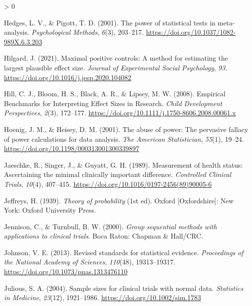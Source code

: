 \documentclass[
  english,
  ,jou,floatsintext]{apa6}
\newlength{\cslhangindent}
\newenvironment{CSLReferences}[2] %
 {%
  \setlength{\parindent}{0pt}
  \ifodd #1 \everypar{\setlength{\hangindent}{\cslhangindent}}\ignorespaces\fi
  \ifnum #2 > 0
  \setlength{\parskip}{#2\baselineskip}
  \fi
 }%
 {}
\begin{document}
\begin{CSLReferences}{1}{0}
\leavevmode\hypertarget{ref-hedges_power_2001}{}%
Hedges, L. V., \& Pigott, T. D. (2001). The power of statistical tests in meta-analysis. \emph{Psychological Methods}, \emph{6}(3), 203--217. \url{https://doi.org/10.1037/1082-989X.6.3.203}

\leavevmode\hypertarget{ref-hilgard_maximal_2021}{}%
Hilgard, J. (2021). Maximal positive controls: {A} method for estimating the largest plausible effect size. \emph{Journal of Experimental Social Psychology}, \emph{93}. \url{https://doi.org/10.1016/j.jesp.2020.104082}

\leavevmode\hypertarget{ref-hill_empirical_2008}{}%
Hill, C. J., Bloom, H. S., Black, A. R., \& Lipsey, M. W. (2008). Empirical {Benchmarks} for {Interpreting Effect Sizes} in {Research}. \emph{Child Development Perspectives}, \emph{2}(3), 172--177. \url{https://doi.org/10.1111/j.1750-8606.2008.00061.x}

\leavevmode\hypertarget{ref-hoenig_abuse_2001}{}%
Hoenig, J. M., \& Heisey, D. M. (2001). The abuse of power: The pervasive fallacy of power calculations for data analysis. \emph{The American Statistician}, \emph{55}(1), 19--24. \url{https://doi.org/10.1198/000313001300339897}

\leavevmode\hypertarget{ref-jaeschke_measurement_1989}{}%
Jaeschke, R., Singer, J., \& Guyatt, G. H. (1989). Measurement of health status: {Ascertaining} the minimal clinically important difference. \emph{Controlled Clinical Trials}, \emph{10}(4), 407--415. \url{https://doi.org/10.1016/0197-2456(89)90005-6}

\leavevmode\hypertarget{ref-jeffreys_theory_1939}{}%
Jeffreys, H. (1939). \emph{Theory of probability} (1st ed). {Oxford {[}Oxfordshire{]}: New York}: {Oxford University Press}.

\leavevmode\hypertarget{ref-jennison_group_2000}{}%
Jennison, C., \& Turnbull, B. W. (2000). \emph{Group sequential methods with applications to clinical trials}. {Boca Raton}: {Chapman \& Hall/CRC}.

\leavevmode\hypertarget{ref-johnson_revised_2013}{}%
Johnson, V. E. (2013). Revised standards for statistical evidence. \emph{Proceedings of the National Academy of Sciences}, \emph{110}(48), 19313--19317. \url{https://doi.org/10.1073/pnas.1313476110}

\leavevmode\hypertarget{ref-julious_sample_2004}{}%
Julious, S. A. (2004). Sample sizes for clinical trials with normal data. \emph{Statistics in Medicine}, \emph{23}(12), 1921--1986. \url{https://doi.org/10.1002/sim.1783}


\end{CSLReferences}
\end{document}
